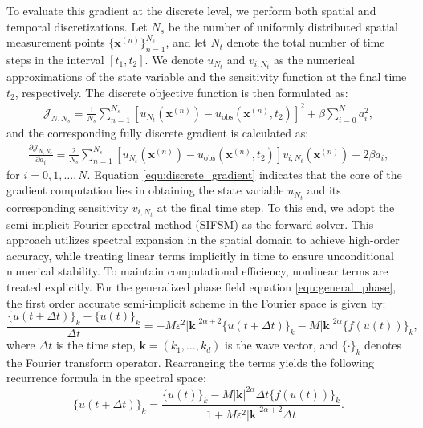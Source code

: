 \documentclass[11pt,reqno]{amsart}
\begin{document}
To evaluate this gradient at the discrete level, we perform both spatial and temporal discretizations. Let $N_s$ be the number of uniformly distributed spatial measurement points $\{\mathbf{x}^{(n)}\}_{n=1}^{N_s}$, and let $N_t$ denote the total number of time steps in the interval $[t_1, t_2]$. We denote $u_{N_t}$ and $v_{i, N_t}$ as the numerical approximations of the state variable and the sensitivity function at the final time $t_2$, respectively. The discrete objective function is then formulated as:
\begin{align}
	\label{equ:discrete_loss_func}
	\mathcal{J}_{N,N_s} = \frac{1}{N_s} \sum\limits_{n=1}^{N_s} \left[u_{N_t}(\mathbf{x}^{(n)})-u_{\text{obs}}(\mathbf{x}^{(n)},t_2)\right]^2 + \beta \sum\limits_{i=0}^N a_i^2,
\end{align}
and the corresponding fully discrete gradient is calculated as:
\begin{align}
	\label{equ:discrete_gradient}
	\frac{\partial \mathcal{J}_{N,N_s}}{\partial a_i} = \frac{2}{N_s}\sum_{n=1}^{N_s} \left[ u_{N_t}(\mathbf{x}^{(n)}) - u_{\text{obs}}(\mathbf{x}^{(n)}, t_2) \right] v_{i, N_t}(\mathbf{x}^{(n)}) + 2\beta a_i,
\end{align}
for $i=0, 1, \dots, N$. 
Equation \eqref{equ:discrete_gradient} indicates that the core of the gradient computation lies in obtaining the state variable $u_{N_t}$ and its corresponding sensitivity $v_{i, N_t}$ at the final time step. To this end, we adopt the semi-implicit Fourier spectral method (SIFSM) \cite{chen2002phase} as the forward solver. This approach utilizes spectral expansion in the spatial domain to achieve high-order accuracy, while treating linear terms implicitly in time to ensure unconditional numerical stability. To maintain computational efficiency, nonlinear terms are treated explicitly. For the generalized phase field equation \eqref{equ:general_phase}, the first order accurate semi-implicit scheme in the Fourier space is given by:
\begin{equation*}
	\frac{\{u(t+\Delta t)\}_k - \{u(t)\}_k}{\Delta t} = -M\varepsilon^2 |\mathbf{k}|^{2\alpha+2} \{u(t+\Delta t)\}_k - M|\mathbf{k}|^{2\alpha} \{f(u(t))\}_k,
\end{equation*}
where $\Delta t$ is the time step, $\mathbf{k} = (k_1, \dots, k_d)$ is the wave vector, and $\{\cdot\}_k$ denotes the Fourier transform operator. Rearranging the terms yields the following recurrence formula in the spectral space:
\begin{equation}
	\label{equ:SIMSM}
	\{u(t+\Delta t)\}_k = \frac{\{u(t)\}_k - M |\mathbf{k}|^{2\alpha} \Delta t \{f(u(t))\}_k}{1 + M \varepsilon^2 |\mathbf{k}|^{2\alpha + 2} \Delta t}.
\end{equation}
\end{document}
